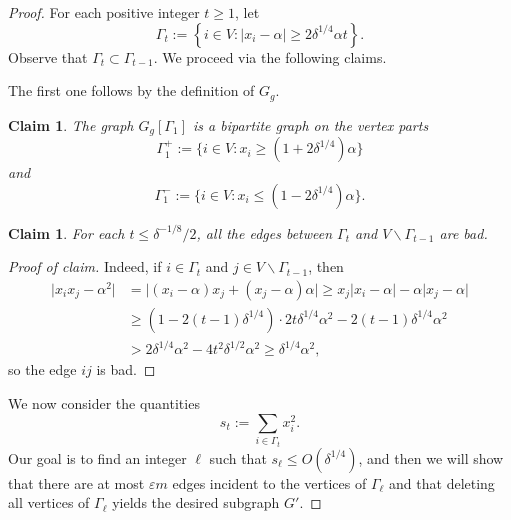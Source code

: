 \documentclass[11pt,a4paper]{article}
\newtheorem{claim}[theorem]{Claim}
\theoremstyle{definition}
\theoremstyle{remark}
\newenvironment{poc}{\begin{proof}[Proof of claim]\renewcommand*{\qedsymbol}{$\blacksquare$}}{\end{proof}}
\newcommand*{\abs}[1]{\lvert#1\rvert}
\begin{document}
\begin{proof}
    For each positive integer $t \geq 1$, let 
    $$\Gamma_t:=\left\{i \in V: |x_i - \alpha| \geq 2\delta^{1/4} \alpha t \right\}.$$ 
    Observe that $\Gamma_t \subset \Gamma_{t - 1}$. We proceed via the following claims.

    The first one follows by the definition of $G_g$.
    
    \begin{claim}\label{cl:obs1}
    The graph $G_g[\Gamma_1]$ is a bipartite graph on the vertex parts 
   \[ \Gamma_1^+ := \{i \in V: x_i \geq (1 + 2\delta^{1/4}) \alpha\} \]
    and 
    \[ \Gamma_1^- := \{i \in V: x_i \leq (1 - 2\delta^{1/4}) \alpha\}. \]
    \end{claim}

    \begin{claim}\label{cl:obs2}
    For each $t \leq \delta^{-1/8} / 2$, all the edges between $\Gamma_t$ and $V \backslash \Gamma_{t - 1}$ are bad. 
    \end{claim}
    
    \begin{poc}
    Indeed, if $i \in \Gamma_t$ and $j \in V \backslash \Gamma_{t - 1}$, then
    \begin{align*}
    \abs{x_i x_j - \alpha^2} &= \abs{(x_i - \alpha)x_j + (x_j - \alpha)\alpha} \geq x_j\abs{x_i - \alpha} - \alpha 
    \abs{x_j - \alpha} \\
    &\geq (1 - 2(t - 1)\delta^{1/4}) \cdot 2t\delta^{1/4}\alpha^2  -
    2(t - 1)\delta^{1/4} \alpha^2 \\
    &> 2\delta^{1/4} \alpha^2 
    - 4t^2 \delta^{1/2} \alpha^2\geq \delta^{1/4} \alpha^2, 
    \end{align*}
    so the edge $ij$ is bad.
    \end{poc}

    We now consider the quantities 
    $$s_t := \sum_{i \in \Gamma_t} x_i^2.$$
    Our goal is to find an integer $\ell$ such that 
    $s_{\ell} \le O(\delta^{1/4})$, and then we will show that there are at most $\varepsilon m$ edges incident to the vertices of $\Gamma_{\ell}$ and that deleting all vertices of $\Gamma_{\ell}$ yields the desired subgraph $G'$.


\end{proof}
\end{document}
